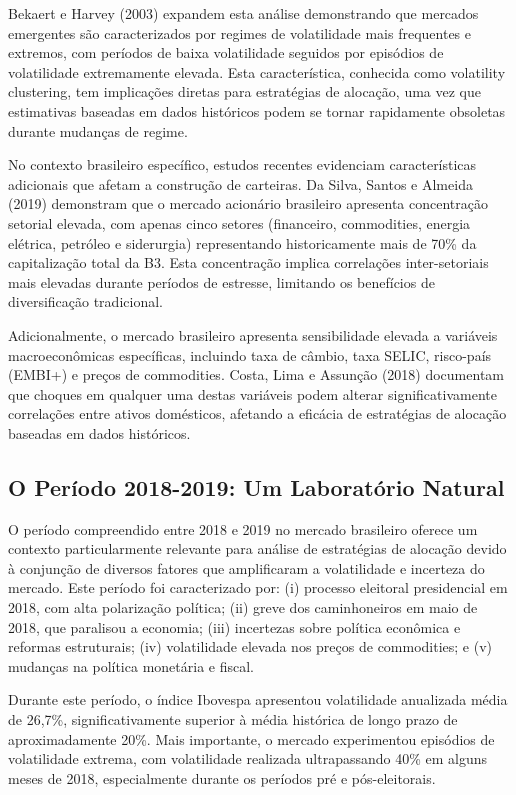 Bekaert e Harvey (2003) expandem esta análise demonstrando que mercados emergentes são caracterizados por regimes de volatilidade mais frequentes e extremos, com períodos de baixa volatilidade seguidos por episódios de volatilidade extremamente elevada. Esta característica, conhecida como volatility clustering, tem implicações diretas para estratégias de alocação, uma vez que estimativas baseadas em dados históricos podem se tornar rapidamente obsoletas durante mudanças de regime.

No contexto brasileiro específico, estudos recentes evidenciam características adicionais que afetam a construção de carteiras. Da Silva, Santos e Almeida (2019) demonstram que o mercado acionário brasileiro apresenta concentração setorial elevada, com apenas cinco setores (financeiro, commodities, energia elétrica, petróleo e siderurgia) representando historicamente mais de 70\% da capitalização total da B3. Esta concentração implica correlações inter-setoriais mais elevadas durante períodos de estresse, limitando os benefícios de diversificação tradicional.

Adicionalmente, o mercado brasileiro apresenta sensibilidade elevada a variáveis macroeconômicas específicas, incluindo taxa de câmbio, taxa SELIC, risco-país (EMBI+) e preços de commodities. Costa, Lima e Assunção (2018) documentam que choques em qualquer uma destas variáveis podem alterar significativamente correlações entre ativos domésticos, afetando a eficácia de estratégias de alocação baseadas em dados históricos.

\subsection{O Período 2018-2019: Um Laboratório Natural}

O período compreendido entre 2018 e 2019 no mercado brasileiro oferece um contexto particularmente relevante para análise de estratégias de alocação devido à conjunção de diversos fatores que amplificaram a volatilidade e incerteza do mercado. Este período foi caracterizado por: (i) processo eleitoral presidencial em 2018, com alta polarização política; (ii) greve dos caminhoneiros em maio de 2018, que paralisou a economia; (iii) incertezas sobre política econômica e reformas estruturais; (iv) volatilidade elevada nos preços de commodities; e (v) mudanças na política monetária e fiscal.

Durante este período, o índice Ibovespa apresentou volatilidade anualizada média de 26,7\%, significativamente superior à média histórica de longo prazo de aproximadamente 20\%. Mais importante, o mercado experimentou episódios de volatilidade extrema, com volatilidade realizada ultrapassando 40\% em alguns meses de 2018, especialmente durante os períodos pré e pós-eleitorais.

